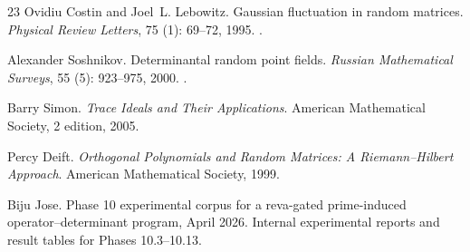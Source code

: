 \documentclass[11pt]{article}
\theoremstyle{definition}
\theoremstyle{plain}
\begin{document}
\begin{thebibliography}{23}
Ovidiu Costin and Joel~L. Lebowitz.
\newblock Gaussian fluctuation in random matrices.
\newblock \emph{Physical Review Letters}, 75 (1): 69--72,
  1995.
\newblock {}.

Alexander Soshnikov.
\newblock Determinantal random point fields.
\newblock \emph{Russian Mathematical Surveys}, 55 (5):
  923--975, 2000.
\newblock {}.

Barry Simon.
\newblock \emph{Trace Ideals and Their Applications}.
\newblock American Mathematical Society, 2 edition, 2005.

Percy Deift.
\newblock \emph{Orthogonal Polynomials and Random Matrices: A Riemann--Hilbert
  Approach}.
\newblock American Mathematical Society, 1999.

Biju Jose.
\newblock Phase 10 experimental corpus for a reva-gated prime-induced
  operator--determinant program, April 2026{}.
\newblock Internal experimental reports and result tables for Phases
  10.3--10.13.

\end{thebibliography}
\end{document}
